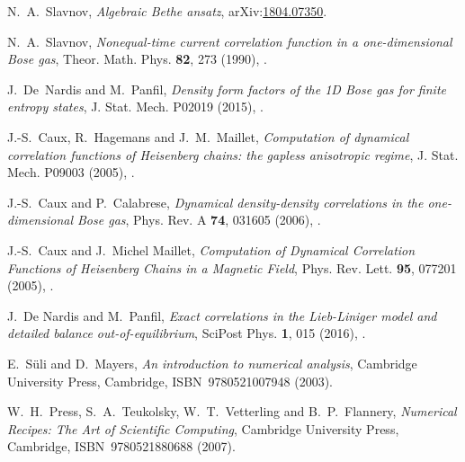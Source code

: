 \documentclass[11pt, a4paper]{report} %
\begin{document}
\begin{thebibliography}{99}
N.~A.~Slavnov, \textit{Algebraic Bethe ansatz}, arXiv:\href{https://arxiv.org/abs/1804.07350}{1804.07350}.




N.~A.~Slavnov, \textit{Nonequal-time current correlation function in a one-dimensional Bose gas}, Theor. Math. Phys. \textbf{82}, 273 (1990), .




J.~De~Nardis and M.~Panfil, \textit{Density form factors of the 1D Bose gas for finite entropy states}, J. Stat. Mech. P02019 (2015), .




J.-S.~Caux, R.~Hagemans and J.~M.~Maillet, \textit{Computation of dynamical correlation functions of Heisenberg chains: the gapless anisotropic regime}, J. Stat. Mech. P09003 (2005), .




J.-S.~Caux and P.~Calabrese, \textit{Dynamical density-density correlations in the one-dimensional Bose gas}, Phys. Rev. A \textbf{74}, 031605 (2006), .



J.-S.~Caux and J.~Michel Maillet, \textit{Computation of Dynamical Correlation Functions of Heisenberg Chains in a Magnetic Field}, Phys. Rev. Lett. \textbf{95}, 077201 (2005), .




J.~De Nardis and M.~Panfil, \textit{Exact correlations in the Lieb-Liniger model and detailed balance  out-of-equilibrium}, SciPost Phys. \textbf{1}, 015 (2016), .




E.~S{\"u}li and D.~Mayers, \textit{An introduction to numerical analysis}, Cambridge University Press, Cambridge, ISBN~9780521007948 (2003).





W.~H.~Press, S.~A.~Teukolsky, W.~T.~Vetterling and B.~P.~Flannery, \textit{Numerical Recipes: The Art of Scientific Computing}, Cambridge University Press, Cambridge, ISBN~9780521880688 (2007).






\end{thebibliography}
\end{document}
